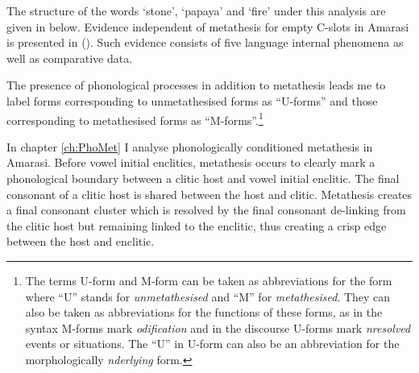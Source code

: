 The structure of the words  `stone',  `papaya' and  `fire'
under this analysis are given in  below.
Evidence independent of metathesis for empty C-slots in Amarasi 
is presented in ().
Such evidence consists of five language internal
phenomena as well as comparative data.

\begin{multicols}{3}
	\begin{exe}
		\label{as:fatu/kaut/ai ch:Int}
	\end{exe}
\end{multicols}

The presence of phonological processes in addition to metathesis
leads me to label forms corresponding to unmetathesised forms as ``U-forms''
and those corresponding to metathesised forms as ``M-forms''.\footnote{
		The terms U-form and M-form can be taken as abbreviations for the form
		where ``U'' stands for \emph{unmetathesised} and ``M'' for \emph{metathesised}.
		They can also be taken as abbreviations for the functions of these forms,
		as in the syntax M-forms mark \emph{odification}
		and in the discourse U-forms mark \emph{nresolved} events or situations.
		The ``U'' in U-form can also be an abbreviation for
		the morphologically \emph{nderlying} form.}

In chapter \ref{ch:PhoMet} I analyse phonologically conditioned metathesis in Amarasi.
Before vowel initial enclitics, metathesis occurs
to clearly mark a phonological boundary between
a clitic host and vowel initial enclitic.
The final consonant of a clitic host is shared between the host and clitic.
Metathesis creates a final consonant cluster which is resolved
by the final consonant de-linking from the clitic host but remaining linked to the enclitic,
thus creating a crisp edge between the host and enclitic.

